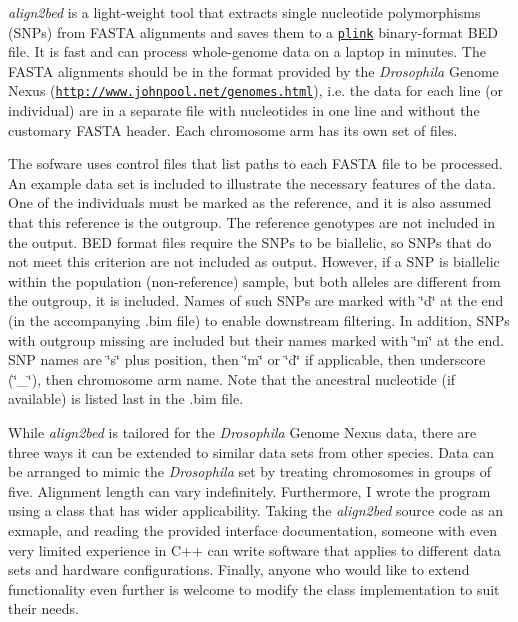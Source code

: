 {\itshape align2bed} is a light-\/weight tool that extracts single nucleotide polymorphisms (S\+N\+Ps) from F\+A\+S\+TA alignments and saves them to a \href{http://zzz.bwh.harvard.edu/plink/index.shtml}{\tt plink} binary-\/format B\+ED file. It is fast and can process whole-\/genome data on a laptop in minutes. The F\+A\+S\+TA alignments should be in the format provided by the {\itshape Drosophila} Genome Nexus (\href{http://www.johnpool.net/genomes.html}{\tt http\+://www.\+johnpool.\+net/genomes.\+html}), i.\+e. the data for each line (or individual) are in a separate file with nucleotides in one line and without the customary F\+A\+S\+TA header. Each chromosome arm has its own set of files.

The sofware uses control files that list paths to each F\+A\+S\+TA file to be processed. An example data set is included to illustrate the necessary features of the data. One of the individuals must be marked as the reference, and it is also assumed that this reference is the outgroup. The reference genotypes are not included in the output. B\+ED format files require the S\+N\+Ps to be biallelic, so S\+N\+Ps that do not meet this criterion are not included as output. However, if a S\+NP is biallelic within the population (non-\/reference) sample, but both alleles are different from the outgroup, it is included. Names of such S\+N\+Ps are marked with \char`\"{}d\char`\"{} at the end (in the accompanying .bim file) to enable downstream filtering. In addition, S\+N\+Ps with outgroup missing are included but their names marked with \char`\"{}m\char`\"{} at the end. S\+NP names are \char`\"{}s\char`\"{} plus position, then \char`\"{}m\char`\"{} or \char`\"{}d\char`\"{} if applicable, then underscore (\char`\"{}\+\_\+\char`\"{}), then chromosome arm name. Note that the ancestral nucleotide (if available) is listed last in the .bim file.

While {\itshape align2bed} is tailored for the {\itshape Drosophila} Genome Nexus data, there are three ways it can be extended to similar data sets from other species. Data can be arranged to mimic the {\itshape Drosophila} set by treating chromosomes in groups of five. Alignment length can vary indefinitely. Furthermore, I wrote the program using a class that has wider applicability. Taking the {\itshape align2bed} source code as an exmaple, and reading the provided interface documentation, someone with even very limited experience in C++ can write software that applies to different data sets and hardware configurations. Finally, anyone who would like to extend functionality even further is welcome to modify the class implementation to suit their needs.

